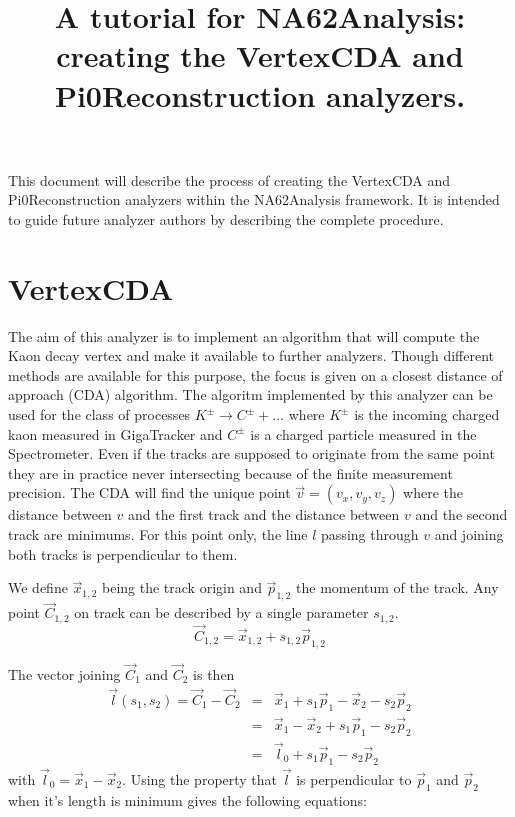 \documentclass{article}
\title{A tutorial for NA62Analysis: creating the VertexCDA and
Pi0Reconstruction analyzers.}
\begin{document}
\maketitle

This document will describe the process of creating the VertexCDA and
Pi0Reconstruction analyzers within the NA62Analysis framework. It is intended to
guide future analyzer authors by describing the complete procedure.

\section{VertexCDA}
The aim of this analyzer is to implement an algorithm that will compute the Kaon
decay vertex and make it available to further analyzers. Though different
methods are available for this purpose, the focus is given on a closest distance
of approach (CDA) algorithm. The algoritm implemented by this analyzer can be
used for the class of processes $K^\pm\to C^\pm+\ldots$ where $K^\pm$ is the
incoming charged kaon measured in GigaTracker and $C^\pm$ is a charged particle
measured in the Spectrometer. Even if the tracks are supposed to originate from
the same point they are in practice never intersecting because of the
finite measurement precision. The CDA will find the unique point
$\vec{v}=(v_x,v_y,v_z)$ where the distance between $v$ and the first track and
the distance between $v$ and the second track are minimums. For this point only,
the line $l$ passing through $v$ and joining both tracks is perpendicular to them.

\newcommand{\p}[1]{\vec{p}_{#1}}
\newcommand{\ap}[1]{|\vec{p}_{#1}|^2}
\newcommand{\lv}{\vec{l}}
\newcommand{\lz}{\vec{l}_{0}}
\newcommand{\C}[1]{\vec{C}_{#1}}
\newcommand{\x}[1]{\vec{x}_{#1}}

We define $\vec{x}_{1,2}$ being the track origin and $\p{1,2}$ the
momentum of the track. Any point $\C{1,2}$ on track can be described by a
single parameter $s_{1,2}$.
\begin{equation}
	\C{1,2} = \x{1,2} + s_{1,2} \p{1,2}
\end{equation}

The vector joining $\C{1}$ and $\C{2}$ is then
\begin{eqnarray}
	\lv(s_1,s_2)=\C{1}-\C{2} &=& \x{1}+s_1\p{1} - \x{2} - s_2\p{2}\\
	&=& \x{1}-\x{2} + s_1\p{1} - s_2\p{2}\\
	&=& \lz + s_1\p{1} - s_2\p{2}
\end{eqnarray}
with $\lz = \x{1}-\x{2}$. Using the property that $\lv$ is perpendicular to
$\p{1}$ and $\p{2}$ when it's length is minimum gives the following
equations:
\end{document}
